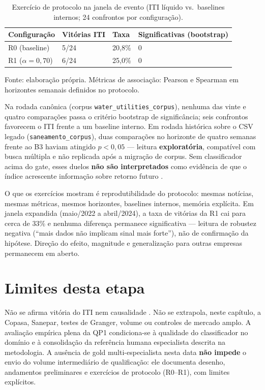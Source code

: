 \begin{table}[htbp]
\caption{Exercício de protocolo na janela de evento (ITI líquido vs.\ baselines internos; 24 confrontos por configuração).}
\label{tab:r0_r1_evento}
\begin{tabular}{|p{}|p{}|p{}|p{}|}
\hline
\textbf{Configuração} & \textbf{Vitórias ITI} & \textbf{Taxa} & \textbf{Significativas (bootstrap)} \\
\hline
R0 (baseline) & 5/24 & 20,8\% & 0 \\
\hline
R1 ($\alpha = 0{,}70$) & 6/24 & 25,0\% & 0 \\
\hline
\end{tabular}

\vspace{0.4em}
{\footnotesize Fonte: elaboração própria. Métricas de associação: Pearson e Spearman em horizontes semanais definidos no protocolo.}

\end{table}

Na rodada canônica (corpus \texttt{water\_utilities\_corpus}), nenhuma das vinte e quatro comparações passa o critério bootstrap de significância; seis confrontos favorecem o ITI frente a um baseline interno. Em rodada histórica sobre o CSV legado (\texttt{saneamento\_corpus}), duas comparações no horizonte de quatro semanas frente ao B3 haviam atingido $p < 0{,}05$ --- leitura \textbf{exploratória}, compatível com busca múltipla \cite{yoshinaga2012sentimento} e não replicada após a migração de corpus. Sem classificador acima do gate, esses duelos \textbf{não são interpretados} como evidência de que o índice acrescente informação sobre retorno futuro \cite{eramiars2025correlacao,duarte2020news}.

O que os exercícios mostram é reprodutibilidade do protocolo: mesmas notícias, mesmas métricas, mesmos horizontes, baselines internos, memória explícita. Em janela expandida (maio/2022 a abril/2024), a taxa de vitórias da R1 cai para cerca de 33\% e nenhuma diferença permanece significativa --- leitura de robustez negativa (``mais dados não implicam sinal mais forte''), não de confirmação da hipótese. Direção do efeito, magnitude e generalização para outras empresas permanecem em aberto.

\section{Limites desta etapa}

Não se afirma vitória do ITI nem causalidade \cite{utfpr2024bert}. Não se extrapola, neste capítulo, a Copasa, Sanepar, testes de Granger, volume ou controles de mercado amplo. A avaliação empírica plena da QP1 condiciona-se à qualidade do classificador no domínio e à consolidação da referência humana especialista descrita na metodologia. A ausência de gold multi-especialista nesta data \textbf{não impede} o envio do volume intermediário de qualificação: ele documenta desenho, andamentos preliminares e exercícios de protocolo (R0--R1), com limites explícitos.
